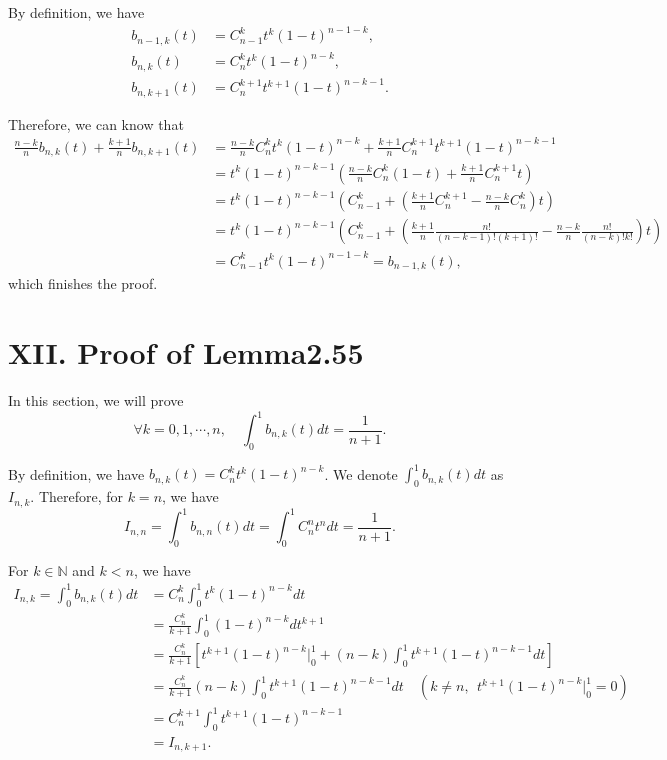 \documentclass[a4paper]{article}
\begin{document}
By definition, we have
\begin{equation}
  \begin{aligned}
    b_{n-1,k}(t) &= C_{n-1}^k t^k (1-t)^{n-1-k}, \\
    b_{n,k}(t) &= C_n^k t^k (1-t)^{n-k}, \\
    b_{n,k+1}(t) &= C_n^{k+1} t^{k+1} (1-t)^{n-k-1}.
  \end{aligned}
\end{equation}

Therefore, we can know that
\begin{equation}
  \begin{aligned}
    \frac{n-k}{n} b_{n,k}(t) + \frac{k+1}{n} b_{n,k+1}(t) &= \frac{n-k}{n} C_n^k t^k (1-t)^{n-k} + \frac{k+1}{n} C_n^{k+1} t^{k+1} (1-t)^{n-k-1} \\
    &= t^k (1-t)^{n-k-1} \left(\frac{n-k}{n}C_n^k(1-t) + \frac{k+1}{n}C_n^{k+1}t \right) \\
    &= t^k (1-t)^{n-k-1} \left(C_{n-1}^k + (\frac{k+1}{n}C_n^{k+1} - \frac{n-k}{n}C_n^k)t\right) \\
    &= t^k (1-t)^{n-k-1} \left(C_{n-1}^k + (\frac{k+1}{n} \frac{n!}{(n-k-1)!(k+1)!} - \frac{n-k}{n} \frac{n!}{(n-k)!k!})t\right) \\
    &= C_{n-1}^k t^k (1-t)^{n-1-k} = b_{n-1,k}(t),
  \end{aligned}
\end{equation}
which finishes the proof.


\section*{XII. Proof of Lemma2.55}
In this section, we will prove
\begin{equation}
  \forall k=0,1,\cdots,n,\quad \int_{0}^{1} b_{n,k}(t) dt = \frac{1}{n+1}.
\end{equation}

By definition, we have $b_{n,k}(t) = C_n^k t^k (1-t)^{n-k}$. We denote $\int_{0}^{1} b_{n,k}(t) dt$ as $I_{n,k}$. Therefore, for $k=n$, we have
\begin{equation}
  I_{n,n} = \int_{0}^{1} b_{n,n}(t) dt = \int_{0}^{1} C_n^n t^n dt = \frac{1}{n+1}.
\end{equation}

For $k \in \mathbb{N}$ and $k < n$, we have
\begin{equation}
  \begin{aligned}
    I_{n,k} = \int_{0}^{1} b_{n,k}(t) dt &= C_n^k \int_{0}^{1} t^k (1-t)^{n-k} dt \\
    &= \frac{C_n^k}{k+1} \int_{0}^{1} (1-t)^{n-k} d t^{k+1} \\
    &= \frac{C_n^k}{k+1} \left[t^{k+1}(1-t)^{n-k} \vert_0^1 + (n-k)\int_{0}^{1}t^{k+1}(1-t)^{n-k-1} dt \right] \\
    &= \frac{C_n^k}{k+1} (n-k) \int_{0}^{1}t^{k+1}(1-t)^{n-k-1} dt \quad (k\ne n, ~~t^{k+1}(1-t)^{n-k} \vert_0^1 = 0) \\
    &= C_n^{k+1} \int_{0}^{1}t^{k+1}(1-t)^{n-k-1} \\
    &= I_{n,k+1}.
  \end{aligned}
\end{equation}
\end{document}
